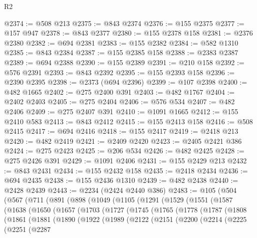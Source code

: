 \begin{lexlean}{R2}
\begin{coremodule}
@2374 := @508 @213
@2375 := @843 @2374
@2376 := @155 @2375
@2377 := @157 @947
@2378 := @843 @2377
@2380 := @155 @2378 @158
@2381 := @2376 @2380
@2382 := @694 @2381
@2383 := @155 @2382
@2384 := @582 @1310
@2385 := @843 @2384
@2387 := @155 @2385 @158
@2388 := @2383 @2387
@2389 := @694 @2388
@2390 := @155 @2389
@2391 := @210 @158
@2392 := @576 @2391
@2393 := @843 @2392
@2395 := @155 @2393 @158
@2396 := @2390 @2395
@2398 := @2373 (@694 @2396)
@2399 := @107 @2398
@2400 := @482 @1665
@2402 := @275 @2400 @391
@2403 := @482 @1767
@2404 := @2402 @2403
@2405 := @275 @2404
@2406 := @576 @534
@2407 := @482 @2406
@2409 := @275 @2407 @391
@2410 := @1091 @1665
@2412 := @155 @2410 @583
@2413 := @843 @2412
@2415 := @155 @2413 @158
@2416 := @508 @2415
@2417 := @694 @2416
@2418 := @155 @2417
@2419 := @2418 @213
@2420 := @482 @2419
@2421 := @2409 @2420
@2423 := @2405 @2421 @386
@2424 := @275 @2423
@2425 := @206 @534
@2426 := @482 @2425
@2428 := @275 @2426 @391
@2429 := @1091 @2406
@2431 := @155 @2429 @213
@2432 := @843 @2431
@2434 := @155 @2432 @158
@2435 := @2418 @2434
@2436 := @694 @2435
@2438 := @155 @2436 @1310
@2439 := @482 @2438
@2440 := @2428 @2439
@2443 := @2234 (@2424 @2440 @386)
@2483 := @105
    (@504
      (@567
        (@711
          (@891
            (@898
              (@1049
                (@1105
                  (@1291
                    (@1529
                      (@1551
                        (@1587
                          (@1638
                            (@1650
                              (@1657
                                (@1703
                                  (@1727
                                    (@1745
                                      (@1765
                                        (@1778
                                          (@1787
                                            (@1808
                                              (@1861
                                                (@1881
                                                  (@1890
                                                    (@1922
                                                      (@1989
                                                        (@2122
                                                          (@2151
                                                            (@2200
                                                              (@2214
                                                                (@2225
                                                                  (@2251
                                                                    (@2287

\end{coremodule}
\end{lexlean}
